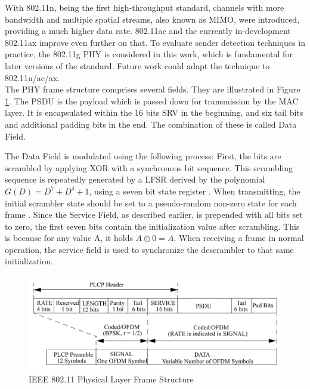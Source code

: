 With 802.11n, being the first high-throughput standard, channels with more bandwidth and multiple spatial streams, also known as \gls{MIMO}, were introduced, providing a much higher data rate. 802.11ac and the currently in-development 802.11ax improve even further on that. To evaluate sender detection techniques in practice, the 802.11g PHY is considered in this work, which is fundamental for later versions of the standard. Future work could adapt the technique to 802.11n/ac/ax.\\

The \gls{PHY} frame structure comprises several fields. They are illustrated in Figure \ref{fig:phy-format}. The \gls{PSDU} is the payload which is passed down for transmission by the \gls{MAC} layer. It is encapsulated within the 16 bits \gls{SRV} in the beginning, and six tail bits and additional padding bits in the end. The combination of these is called Data Field.

The Data Field is modulated using the following process: First, the bits are scrambled by applying XOR with a synchronous bit sequence. This scrambling sequence is repeatedly generated by a \gls{LFSR} derived by the polynomial $G(D)=D^7+D^4+1$, using a seven bit state register \cite{ieee2012}. When transmitting, the initial scrambler state should be set to a pseudo-random non-zero state for each frame \cite{ieee2012}. Since the Service Field, as described earlier, is prepended with all bits set to zero, the first seven bits contain the initialization value after scrambling. This is because for any value A, it holds $A \oplus 0 = A$. When receiving a frame in normal operation, the service field is used to synchronize the descrambler to that same initialization.

\begin{figure}[H]
	\centering
	\includegraphics[width=\textwidth]{gfx/images/phy-format}
	\caption[IEEE 802.11 Physical Layer Frame Structure]{IEEE 802.11 Physical Layer Frame Structure \cite{ieee2012}}
	\label{fig:phy-format}
\end{figure}


